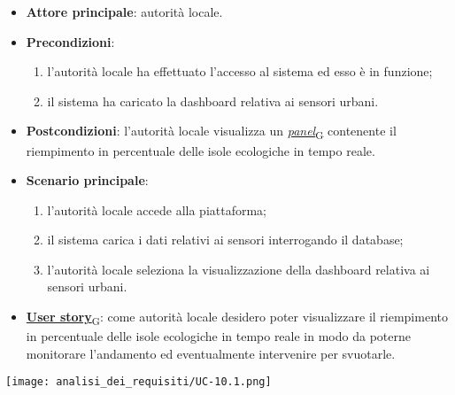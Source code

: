 \begin{itemize}
	\item \textbf{Attore principale}: autorità locale.
	\item \textbf{Precondizioni}:
	      \begin{enumerate}
		      \item l'autorità locale ha effettuato l'accesso al sistema ed esso è in funzione;
		      \item il sistema ha caricato la dashboard relativa ai sensori urbani.
	      \end{enumerate}
	\item \textbf{Postcondizioni}: l'autorità locale visualizza un \href{https://7last.github.io/docs/rtb/documentazione-interna/glossario\#panel}{\textit{panel}\textsubscript{G}} contenente il riempimento in percentuale delle isole ecologiche in tempo reale.
	\item \textbf{Scenario principale}:
	      \begin{enumerate}
		      \item l'autorità locale accede alla piattaforma;
		      \item il sistema carica i dati relativi ai sensori interrogando il database;
		      \item l'autorità locale seleziona la visualizzazione della dashboard relativa ai sensori urbani.
	      \end{enumerate}
	\item \href{https://7last.github.io/docs/rtb/documentazione-interna/glossario\#user-story}{\textbf{User story}\textsubscript{G}}:
	      come autorità locale desidero poter visualizzare il riempimento in percentuale delle isole ecologiche in tempo reale in modo da poterne monitorare l'andamento
	      ed eventualmente intervenire per svuotarle.
\end{itemize}
\begin{center}
	\texttt{[image: analisi\_dei\_requisiti/UC-10.1.png]}
\end{center}


